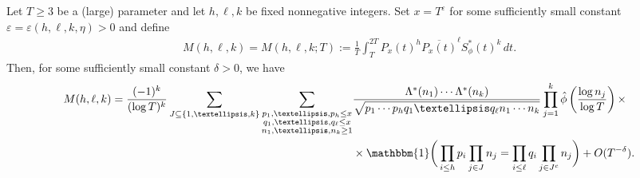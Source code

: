 \documentclass[10pt,a4paper]{amsart}
\newcommand{\Starphi}{S_\phi^*}
\begin{document}
\begin{prop}\label{prop:lkmoments}
    Let $T \ge 3$ be a (large) parameter and let $h,\ell,k$ be fixed nonnegative integers. Set $x = T^{\varepsilon}$ for some sufficiently small constant $\varepsilon = \varepsilon(h,\ell,k,\eta) > 0$ and define 
    \begin{align*}
           M(h,\ell,k) = M(h, \ell,k; T) := \frac{1}{T}\int_T^{2 T} P_x(t)^{h} \overline{P_x(t)}^{\ell} \Starphi(t)^k\, dt.
    \end{align*}
    Then, for some sufficiently small constant $\delta>0$, we have
    \begin{equation}\begin{split}\label{eq:MhkDiag}
        M(h,\ell, k) = \frac{(-1)^k}{(\log T)^k} 
        \sum_{J \subseteq \{1, \dots, k \}} \sum_{\substack{p_1, \dots, p_h\leq x\\
        q_1, \dots, q_\ell\leq x\\ n_1, \dots, n_k \ge 1 }} &\frac{\Lambda^*(n_1) \cdots \Lambda^*(n_k)}{\sqrt{p_1\cdots p_h q_1\dots q_\ell n_1 \cdots n_k}} \prod_{j=1}^k  \hat\phi\left(\frac{\log n_j}{\log T}\right) \times \\
        &\times\mathbbm{1} \bigg( \prod_{i\leq h} p_i \prod_{j \in J} n_j = \prod_{i\leq \ell} q_i \prod_{j\in J^c} n_j \bigg) + O (T^{-\delta}).
    \end{split}\end{equation}
\end{prop}
\end{document}
